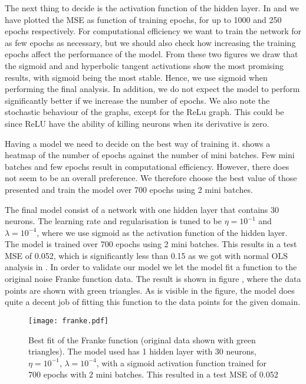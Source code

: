     The next thing to decide is the activation function of the hidden layer. In  and  we have plotted the MSE as function of training epochs, for up to 1000 and 250 epochs respectively. For computational efficiency we want to train the network for as few epochs as necessary, but we should also check how increasing the training epochs affect the performance of the model. From these two figures we draw that the sigmoid and and hyperbolic tangent activations show the most promising results, with sigmoid being the most stable. Hence, we use sigmoid when performing the final analysis. In addition, we do not expect the model to perform significantly better if we increase the number of epochs. We also note the stochastic behaviour of the graphs, except for the ReLu graph. This could be since ReLU have the ability of killing neurons when its derivative is zero. 

    Having a model we need to decide on the best way of training it.  shows a heatmap of the number of epochs against the number of mini batches. Few mini batches and few epochs result in computational efficiency. However, there does not seem to be an overall preference. We therefore choose the best value of those presented and train the model over 700 epochs using 2 mini batches. 

    The final model consist of a network with one hidden layer that contains 30 neurons. The learning rate and regularisation is tuned to be $\eta=10^{-1}$ and $\lambda=10^{-4}$, where we use sigmoid as the activation function of the hidden layer. The model is trained over 700 epochs using 2 mini batches. This results in a test MSE of 0.052, which is significantly less than 0.15 as we got with normal OLS analysis in \projectOne. In order to validate our model we let the model fit a function to the original noise Franke function data. The result is shown in figure , where the data points are shown with green triangles. As is visible in the figure, the model does quite a decent job of fitting this function to the data points for the given domain. 

    \begin{figure}[h!]
        \texttt{[image: franke.pdf]}
        \caption{Best fit of the Franke function (original data shown with green triangles). The model used has 1 hidden layer with 30 neurons, $\eta=10^{-1}$, $\lambda=10^{-4}$, with a sigmoid activation function trained for 700 epochs with 2 mini batches. This resulted in a test MSE of 0.052}
        \label{fig:franke}
    \end{figure}

